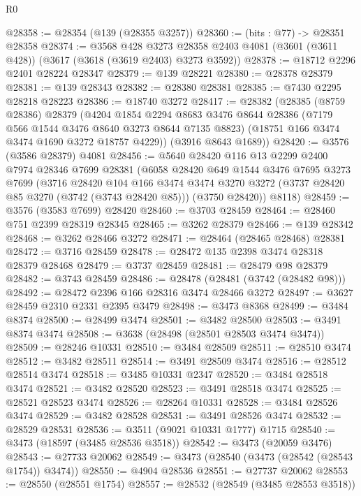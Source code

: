 \begin{lexlean}{R0}
\begin{coremodule}
@28358 := @28354 (@139 (@28355 @3257))
@28360 := (bits : @77) -> @28351 @28358
@28374 := @3568
    @428
    @3273
    @28358
    @2403
    @4081
    (@3601 (@3611 @428))
    (@3617 (@3618 (@3619 @2403) @3273 @3592))
@28378 := @18712 @2296 @2401 @28224 @28347
@28379 := @139 @28221
@28380 := @28378 @28379
@28381 := @139 @28343
@28382 := @28380 @28381
@28385 := @7430 @2295 @28218 @28223
@28386 := @18740 @3272
@28417 := @28382
    (@28385
      (@8759 @28386)
      @28379
      (@4204
        @1854
        @2294
        @8683
        @3476
        @8644
        @28386
        (@7179 @566 @1544 @3476 @8640 @3273 @8644 @7135 @8823)
        (@18751 @166 @3474 @3474 @1690 @3272 @18757 @4229))
      (@3916 @8643 @1689))
@28420 := @3576 (@3586 @28379) @4081
@28456 := @5640
    @28420
    @116
    @13
    @2299
    @2400
    @7974
    @28346
    @7699
    @28381
    (@6058
      @28420
      @649
      @1544
      @3476
      @7695
      @3273
      @7699
      (@3716
        @28420
        @104
        @166
        @3474
        @3474
        @3270
        @3272
        (@3737 @28420 @85 @3270 (@3742 (@3743 @28420 @85)))
        (@3750 @28420))
      @8118)
@28459 := @3576 (@3583 @7699) @28420
@28460 := @3703 @28459
@28464 := @28460 @751 @2399 @28319 @28345
@28465 := @3262 @28379
@28466 := @139 @28342
@28468 := @3262 @28466 @3272
@28471 := @28464 (@28465 @28468) @28381
@28472 := @3716 @28459
@28478 := @28472 @135 @2398 @3474 @28318 @28379 @28468
@28479 := @3737 @28459
@28481 := @28479 @98 @28379
@28482 := @3743 @28459
@28486 := @28478 (@28481 (@3742 (@28482 @98)))
@28492 := @28472 @2396 @166 @28316 @3474 @28466 @3272
@28497 := @3627 @28459 @2310 @2331 @2395 @3479
@28498 := @3473 @8368
@28499 := @3484 @8374
@28500 := @28499 @3474
@28501 := @3482 @28500
@28503 := @3491 @8374 @3474
@28508 := @3638 (@28498 (@28501 @28503 @3474 @3474))
@28509 := @28246 @10331
@28510 := @3484 @28509
@28511 := @28510 @3474
@28512 := @3482 @28511
@28514 := @3491 @28509 @3474
@28516 := @28512 @28514 @3474
@28518 := @3485 @10331 @2347
@28520 := @3484 @28518 @3474
@28521 := @3482 @28520
@28523 := @3491 @28518 @3474
@28525 := @28521 @28523 @3474
@28526 := @28264 @10331
@28528 := @3484 @28526 @3474
@28529 := @3482 @28528
@28531 := @3491 @28526 @3474
@28532 := @28529 @28531
@28536 := @3511 (@9021 @10331 @1777) @1715
@28540 := @3473 (@18597 (@3485 @28536 @3518))
@28542 := @3473 (@20059 @3476)
@28543 := @27733 @20062
@28549 := @3473 (@28540 (@3473 (@28542 (@28543 @1754)) @3474))
@28550 := @4904 @28536
@28551 := @27737 @20062
@28553 := @28550 (@28551 @1754)
@28557 := @28532 (@28549 (@3485 @28553 @3518))

\end{coremodule}
\end{lexlean}
